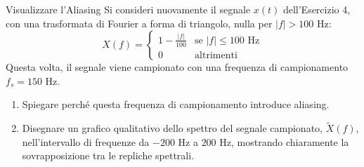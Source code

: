 
\begin{esercizio}{Visualizzare l'Aliasing}
    Si consideri nuovamente il segnale $x(t)$ dell'Esercizio 4, con una trasformata di Fourier a forma di triangolo, nulla per $|f| > 100$ Hz:
    \[
        X(f) = 
        \begin{cases} 
            1 - \frac{|f|}{100} & \text{se } |f| \leq 100 \text{ Hz} \\
            0 & \text{altrimenti}
        \end{cases}
    \]
    Questa volta, il segnale viene campionato con una frequenza di campionamento $f_s = 150$ Hz.
    
    \begin{enumerate}
        \item Spiegare perché questa frequenza di campionamento introduce aliasing.
        \item Disegnare un grafico qualitativo dello spettro del segnale campionato, $\tilde{X}(f)$, nell'intervallo di frequenze da $-200$ Hz a $200$ Hz, mostrando chiaramente la sovrapposizione tra le repliche spettrali.
    \end{enumerate}
\end{esercizio}